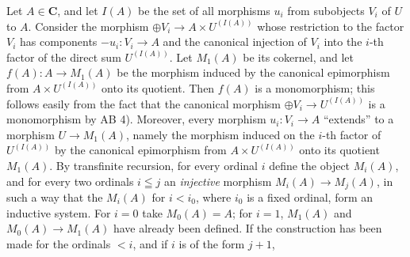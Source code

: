 Let $A\in \mathbf{C}$, and let $I(A)$ be the set of all morphisms $u_i$ from
subobjects $V_i$ of $U$ to $A$. Consider the morphism
$\oplus V_i\to A\times U^{(I(A))}$ whose restriction to the factor $V_i$ has components
$-u_i:V_i\to A$ and the canonical injection of $V_i$ into the
$i$-th factor of the direct sum $U^{(I(A))}$. Let $M_1(A)$ be its cokernel,
and let $f(A):A\to M_1(A)$ be the morphism induced by the
canonical epimorphism from $A\times U^{(I(A))}$ onto its quotient. Then
$f(A)$ is a monomorphism; this follows easily from the fact that the canonical
morphism $\oplus V_i\to U^{(I(A))}$ is a monomorphism by
AB 4). Moreover, every morphism $u_i:V_i\to A$ ``extends'' to a
morphism $U\to M_1(A)$, namely the morphism induced on the $i$-th
factor of $U^{(I(A))}$ by the canonical epimorphism from
$A\times U^{(I(A))}$ onto its quotient $M_1(A)$.
By transfinite recursion, for every ordinal $i$ define the object $M_i(A)$,
and for every two ordinals $i\leqq j$ an \textit{injective} morphism
$M_i(A)\to M_j(A)$, in such a way that the $M_i(A)$ for $i<i_0$,
where $i_0$ is a fixed ordinal, form an inductive system. For $i=0$ take
$M_0(A)=A$; for $i=1$, $M_1(A)$ and $M_0(A)\to M_1(A)$ have
already been defined. If the construction has been made for the ordinals
$<i$, and if $i$ is of the form $j+1$,

